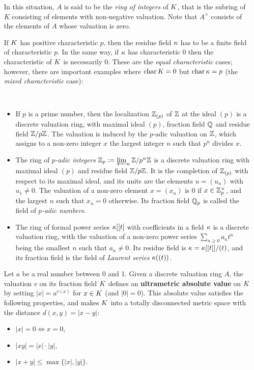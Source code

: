 \documentclass[a4paper, oneside]{memoir}
\begin{document}
In this situation, $A$ is said to be the \textit{ring of integers} of $K$, that is the subring of $K$ consisting of elements with non-negative valuation. Note that $A^\times$ consists
of the elements of $A$ whose valuation is zero.

\begin{remark}
    If \(K\) has positive characteristic \(p\), then the residue field \(\kappa\) has to be a finite field of characteristic \(p\). In the same way, if \(\kappa\) has characteristic \(0\) then
    the characteristic of \(K\) is necessarily \(0\). These are the \textit{equal characteristic} cases; however, there are important examples where \(\operatorname{char}{K}=0\)
    but \(\operatorname{char}{\kappa}=p\) (the \textit{mixed characteristic} case):
\end{remark}


\begin{example}\label{ex:DVR}\
    \begin{itemize}
        \item If $p$ is a prime number, then the localization $\mathbb{Z}_{(p)}$ of $\mathbb{Z}$ at the ideal $(p)$ is a discrete valuation ring, with maximal ideal $(p)$, fraction field $\mathbb{Q}$ and residue field
              $\mathbb{Z}/p\mathbb{Z}$. The valuation is induced by the $p$-adic valuation on $\mathbb{Z}$, which assigns to a non-zero integer $x$ the largest integer $n$ such that $p^n$ divides $x$.
        \item The ring of \textit{$p$-adic integers} $\mathbb{Z}_p:=\varprojlim_n{\mathbb{Z}/p^n\mathbb{Z}}$ is a discrete valuation ring with maximal ideal $(p)$ and residue field $\mathbb{Z}/p\mathbb{Z}$. It is the completion of
              $\mathbb{Z}_{(p)}$ with respect to its maximal ideal, and its units are the elements $u=(u_n)$ with $u_1\neq 0$. The valuation of a non-zero element $x=(x_n)$ is $0$ if
              $x\in\mathbb{Z}_p^\times$, and the largest $n$ such that $x_n= 0$ otherwise. Its fraction field $\mathbb{Q}_p$ is called the field of \textit{$p$-adic numbers}.
        \item The ring of formal power series $\kappa[[t]$ with coefficients in a field $\kappa$ is a discrete valuation ring, with the valuation of a non-zero power series $\sum_{n\geq
                      0}{a_nt^n}$ being the smallest $n$ such that $a_n\neq 0$. Its residue field is $\kappa=\kappa[[t]]/(t)$, and its fraction field is the field of \textit{Laurent series} $\kappa((t))$.
    \end{itemize}
\end{example}

Let $a$ be a real number between 0 and 1. Given a discrete valuation ring $A$, the valuation $v$ on its fraction field $K$ defines an \textbf{ultrametric absolute value} on $K$ by setting $|x|=a^{v(x)}$ for $x\in K$ (and
$|0|=0$). This absolute value satisfies the following properties, and makes $K$ into a totally disconnected metric space with the distance $d(x,y)=|x-y|$:
\begin{itemize}
    \item $|x|=0 \iff x=0$,
    \item $|xy|=|x|\cdot|y|$,
    \item $|x+y|\leq\max\{|x|,|y|\}$.
\end{itemize}
\end{document}
